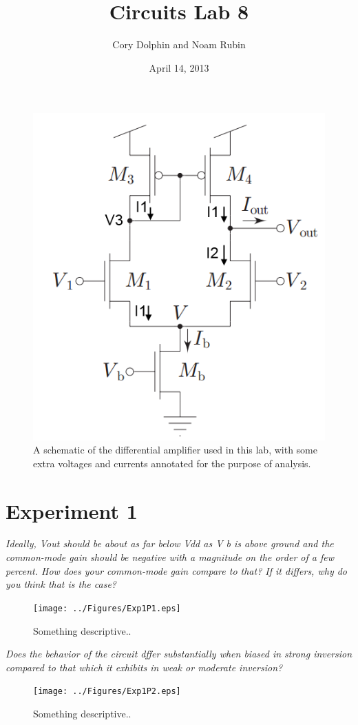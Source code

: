\documentclass{article}
\title{Circuits Lab 8}
\author{Cory Dolphin and Noam Rubin}
\date{April 14, 2013}
\begin{document}
\maketitle

\begin{figure}[H]
\centering
\includegraphics[width=0.6\linewidth]{../Figures/Lab8Schematic}
\caption{A schematic of the differential amplifier used in this lab, with some extra voltages and currents annotated for the purpose of analysis.}
\label{fig:lab8schem}
\end{figure}


\section*{Experiment 1}


\textit{Ideally, Vout should be about as far below Vdd as V b is above ground and the
common-mode gain should be negative with a magnitude on the order of a few percent. How
does your common-mode gain compare to that? If it differs, why do you think that is the
case?}

\begin{figure}[H]
\centering
\texttt{[image: ../Figures/Exp1P1.eps]}
\caption{Something descriptive..}
\label{fig:exp1p1}
\end{figure}

\textit{Does the behavior of the circuit dffer substantially when biased in strong inversion compared to that which it exhibits in
weak or moderate inversion?}

\begin{figure}[H]
\centering
\texttt{[image: ../Figures/Exp1P2.eps]}
\caption{Something descriptive..}
\label{fig:exp1p2}
\end{figure}
\end{document}
